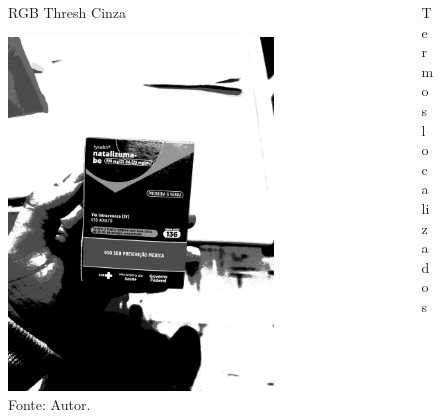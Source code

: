\begin{frame}
	\begin{columns}
		\begin{column}{0.5\textwidth}
			\begin{figure}
				\caption*{RGB Thresh Cinza}
				\includegraphics[width=0.85\textwidth]{../pictures/tysabri_rgb_thresh_gray_thresh.jpg}
				\caption*{Fonte: Autor.}
			\end{figure}
		\end{column}
		\begin{column}{0.5\textwidth}
			\begin{figure}
				\caption*{Termos localizados}

\end{figure}
\end{column}
\end{columns}
\end{frame}
